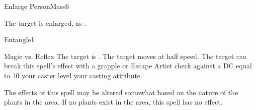 \begin{spellsection}{Enlarge Person}{Mass}{6}
\begin{spellheader}
\end{spellheader}
\begin{spellcontent}
    \begin{spelltargetinginfo}
    \end{spelltargetinginfo}
    \begin{spelleffects}
        \spelleffect The target is enlarged, as .
        \spelldur \durshort \dismissable
    \end{spelleffects}
\end{spellcontent}
\begin{spellfooter}
    \spellnotes \sizingspellnotes
\end{spellfooter}
\end{spellsection}

\begin{spellsection}{Entangle}{1}
\begin{spellheader}
\end{spellheader}
\begin{spellcontent}
    \begin{spelltargetinginfo}
    \end{spelltargetinginfo}
    \begin{spelleffects}
        \begin{spellattack}{Magic vs. Reflex}
            \spellsuccess The target is \immobilized.
            \spellfailure The target moves at half speed.
            \spellspecial The target can break this spell's effect with a grapple or Escape Artist check against a DC equal to 10 \add your caster level \add your casting attribute.
        \end{spellattack}
        \spelldur \durshort
    \end{spelleffects}
\end{spellcontent}
\begin{spellfooter}
    \spellnotes The effects of this spell may be altered somewhat based on the nature of the plants in the area. If no plants exist in the area, this spell has no effect.
\end{spellfooter}
\end{spellsection}

